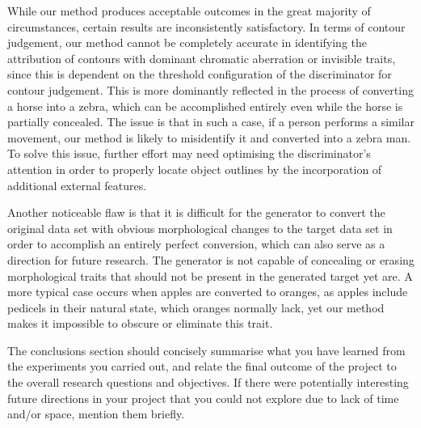 \documentclass{article}
\begin{document}
While our method produces acceptable outcomes in the great majority of circumstances, certain results are inconsistently satisfactory. In terms of contour judgement, our method cannot be completely accurate in identifying the attribution of contours with dominant chromatic aberration or invisible traits, since this is dependent on the threshold configuration of the discriminator for contour judgement. This is more dominantly reflected in the process of converting a horse into a zebra, which can be accomplished entirely even while the horse is partially concealed. The issue is that in such a case, if a person performs a similar movement, our method is likely to misidentify it and converted into a zebra man. To solve this issue, further effort may need optimising the discriminator's attention in order to properly locate object outlines by the incorporation of additional external features.

Another noticeable flaw is that it is difficult for the generator to convert the original data set with obvious morphological changes to the target data set in order to accomplish an entirely perfect conversion, which can also serve as a direction for future research. The generator is not capable of concealing or erasing morphological traits that should not be present in the generated target yet are. A more typical case occurs when apples are converted to oranges, as apples include pedicels in their natural state, which oranges normally lack, yet our method makes it impossible to obscure or eliminate this trait.

\if
The conclusions section should concisely summarise what you have learned from the experiments you carried out, and relate the final outcome of the project to the overall research questions and objectives. If there were potentially interesting future directions in your project that you could not explore due to lack of time and/or space, mention them briefly.
\fi




\end{document}

